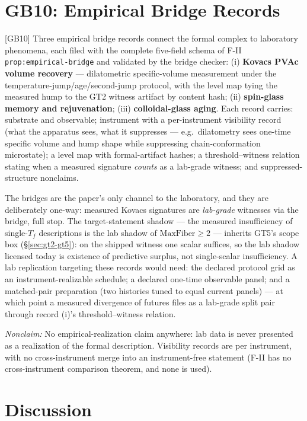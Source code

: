 \documentclass[11pt]{article}
\newcommand{\claimref}[2]{[#1]}
\newcommand{\nonclaim}[1]{\par\noindent\textit{Nonclaim:} #1\par}
\theoremstyle{definition}
\begin{document}
 \section{GB10: Empirical Bridge Records}
\label{sec:bridges}


\claimref{GB10}{8015ce419a3a00e8a1b81217d0796ef53a6467db81cb774d0fa9711694087ab8}
Three empirical bridge records connect the formal complex to laboratory phenomena, each filed with
the complete five-field schema of F-II \texttt{prop:empirical-bridge} and validated by the bridge
checker: (i) \textbf{Kovacs PVAc volume recovery} \cite{kovacs-1963} --- dilatometric
specific-volume measurement under the temperature-jump/age/second-jump protocol, with the level
map tying the measured hump to the GT2 witness artifact by content hash; (ii)
\textbf{spin-glass memory and rejuvenation}; (iii) \textbf{colloidal-glass aging}. Each record
carries: substrate and observable; instrument with a per-instrument visibility record (what the
apparatus sees, what it suppresses --- e.g.\ dilatometry sees one-time specific volume and hump
shape while suppressing chain-conformation microstate); a level map with formal-artifact hashes; a
threshold--witness relation stating when a measured signature \emph{counts} as a lab-grade
witness; and suppressed-structure nonclaims.

The bridges are the paper's only channel to the laboratory, and they are deliberately one-way:
measured Kovacs signatures are \emph{lab-grade} witnesses via the bridge, full stop. The
target-statement shadow --- the measured insufficiency of single-$T_f$ descriptions is the lab
shadow of $\mathrm{MaxFiber} \geq 2$ --- inherits GT5's scope box (\S\ref{sec:gt2-gt5}): on the
shipped witness one scalar suffices, so the lab shadow licensed today is existence of predictive
surplus, not single-scalar insufficiency. A lab replication targeting these records would need:
the declared protocol grid as an instrument-realizable schedule; a declared one-time observable
panel; and a matched-pair preparation (two histories tuned to equal current panels) --- at which
point a measured divergence of futures files as a lab-grade split pair through record (i)'s
threshold--witness relation.

\nonclaim{No empirical-realization claim anywhere: lab data is never presented as a realization of
  the formal description. Visibility records are per instrument, with no cross-instrument merge
  into an instrument-free statement (F-II has no cross-instrument comparison theorem, and none is
  used).}
 \section{Discussion}
\label{sec:discussion}
\end{document}
